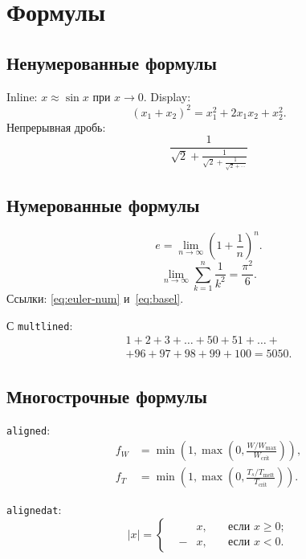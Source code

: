 \documentclass[font=modern]{cmcmsuthesis-cw}
\begin{document}
\section{Формулы}
\label{sec:formulas}

\subsection{Ненумерованные формулы}

Inline: $x \approx \sin x$ при $x \to 0$.
Display: \[(x_1+x_2)^2 = x_1^2 + 2x_1 x_2 + x_2^2.\]
Непрерывная дробь:
\[\frac{1}{\sqrt{2}+\displaystyle\frac{1}{\sqrt{2}+
    \displaystyle\frac{1}{\sqrt{2}+\cdots}}}\]

\subsection{Нумерованные формулы}
\begin{equation}\label{eq:euler-num}
e=\lim_{n\to\infty}\left(1+\frac{1}{n}\right)^{\!n}.
\end{equation}
\begin{equation}\label{eq:basel}
\lim_{n\to\infty}\sum_{k=1}^n\frac{1}{k^2}=\frac{\pi^2}{6}.
\end{equation}
Ссылки: \eqref{eq:euler-num} и~\eqref{eq:basel}.

С \texttt{multlined}:
\begin{equation}\label{eq:longsum}
\begin{multlined}
1+2+3+\dots+50+51+\dots+\\+96+97+98+99+100=5050.
\end{multlined}
\end{equation}

\subsection{Многострочные формулы}

\texttt{aligned}:
\[\begin{aligned}
f_W &= \min\!\left(1,\max\!\left(0,
    \frac{W/W_{\max}}{W_{\text{crit}}}\right)\right),\\
f_T &= \min\!\left(1,\max\!\left(0,
    \frac{T_s/T_{\text{melt}}}{T_{\text{crit}}}\right)\right).
\end{aligned}\]

\texttt{alignedat}:
\[|x|=\left\{\begin{alignedat}{2}
& & x,\quad &\text{если }x\geqslant 0;\\
&-& x,\quad &\text{если }x<0.
\end{alignedat}\right.\]
\end{document}
